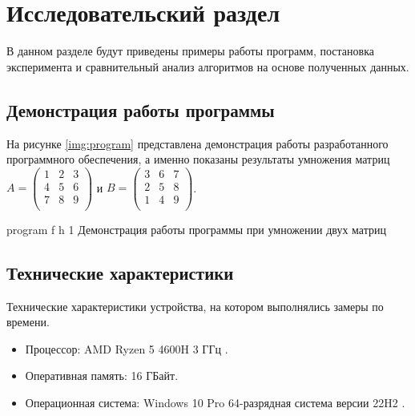 \chapter{Исследовательский раздел}

В данном разделе будут приведены примеры работы программ, постановка эксперимента и сравнительный анализ алгоритмов на основе полученных данных.

\section{Демонстрация работы программы}


На рисунке \ref{img:program} представлена демонстрация работы разработанного программного обеспечения, а именно показаны результаты умножения матриц $A = \begin{pmatrix}
	1 & 2 & 3\\
	4 & 5 & 6 \\
	7 & 8 & 9\\
\end{pmatrix}$ и $B = \begin{pmatrix}
	3 & 6 & 7\\
	2 & 5 & 8 \\
	1 & 4 & 9 \\
\end{pmatrix}$.  
\clearpage

{program} %
{f} %
{h} %
{1\textwidth} %
{Демонстрация работы программы при умножении двух матриц} %

\clearpage


\section{Технические характеристики}

Технические характеристики устройства, на котором выполнялись замеры по времени.

\begin{itemize}
	\item Процессор: AMD Ryzen 5 4600H 3 ГГц \cite{amd}.
	\item Оперативная память: 16 ГБайт.
	\item Операционная система: Windows 10 Pro 64-разрядная система версии 22H2 \cite{windows}.
\end{itemize}

